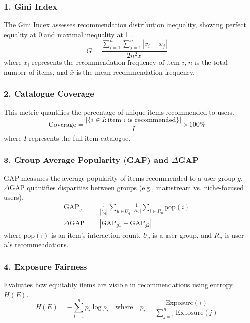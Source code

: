 \documentclass[11pt,a4paper]{report}
\begin{document}
\subsubsection*{1. Gini Index}
The Gini Index assesses recommendation distribution inequality, showing perfect equality at 0 and maximal inequality at 1 \citep{cowell2011measuring}.
\begin{equation}
G = \frac{\sum_{i=1}^{n}\sum_{j=1}^{n}|x_i - x_j|}{2n^2\bar{x}}
\end{equation}
where $x_i$ represents the recommendation frequency of item $i$, $n$ is the total number of items, and $\bar{x}$ is the mean recommendation frequency.

\subsubsection*{2. Catalogue Coverage}
This metric quantifies the percentage of unique items recommended to users.
\begin{equation}
\textrm{Coverage} = \frac{|\{i \in I : \textrm{item } i \textrm{ is recommended}\}|}{|I|} \times 100\%
\end{equation}
where $I$ represents the full item catalogue.

\subsubsection*{3. Group Average Popularity (GAP) and $\Delta$GAP}
GAP measures the average popularity of items recommended to a user group $g$. $\Delta$GAP quantifies disparities between groups (e.g., mainstream vs. niche-focused users).
\begin{align}
\textrm{GAP}_g &= \frac{1}{|U_g|}\sum_{u \in U_g}\frac{1}{|R_u|}\sum_{i \in R_u}\textrm{pop}(i) \\
\Delta\textrm{GAP} &= |\textrm{GAP}_{g1} - \textrm{GAP}_{g2}|
\end{align}
where $\textrm{pop}(i)$ is an item's interaction count, $U_g$ is a user group, and $R_u$ is user $u$'s recommendations.

\subsubsection*{4. Exposure Fairness}
Evaluates how equitably items are visible in recommendations using entropy $H(E)$.
\begin{equation}
H(E) = -\sum_{i=1}^{n}p_i\log p_i \quad \textrm{where} \quad p_i = \frac{\textrm{Exposure}(i)}{\sum_{j=1}^{n}\textrm{Exposure}(j)}
\end{equation}
\end{document}
